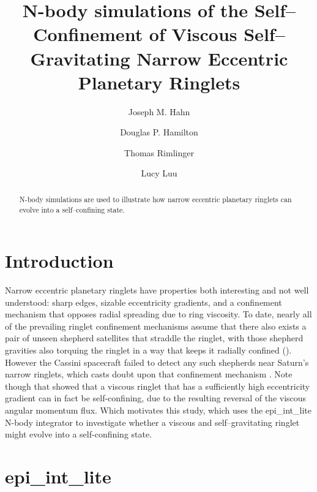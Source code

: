\documentclass[preprint]{aastex62}
\begin{document}
\title{N-body simulations of the Self--Confinement of 
Viscous Self--Gravitating Narrow Eccentric Planetary Ringlets}


\author{Joseph M. Hahn}

\author{Douglas P. Hamilton}

\author{Thomas Rimlinger}

\author{Lucy Luu}


\begin{abstract}

N-body simulations are used
to illustrate how narrow eccentric planetary ringlets can evolve into a 
self--confining state.

\end{abstract}




\section{Introduction}
\label{sec:intro}

Narrow eccentric planetary ringlets have properties both interesting and
not well understood: sharp edges,
sizable eccentricity gradients, and a confinement mechanism that
opposes radial spreading due to ring viscosity. To date, nearly all of the
prevailing ringlet confinement mechanisms assume that there also exists a pair of 
unseen shepherd satellites that straddle the ringlet, with those shepherd gravities
also torquing the ringlet in a way that keeps it radially confined 
(\citealt{GT79, GT79c, GT81, CG00, ME02}). However the Cassini spacecraft failed to detect
any such shepherds near Saturn's narrow ringlets, which casts doubt upon that confinement mechanism
\citep{L18}. Note though that \cite{BGT82} showed that a viscous ringlet that has
a sufficiently high eccentricity gradient can in fact be self-confining,
due to the resulting reversal of the viscous angular momentum flux. 
Which motivates this study, which uses the epi\_int\_lite N-body integrator to 
investigate whether a viscous and self--gravitating ringlet might evolve into a self-confining state.

\section{epi\_int\_lite}
\label{sec:epi_int_lite}
\end{document}
